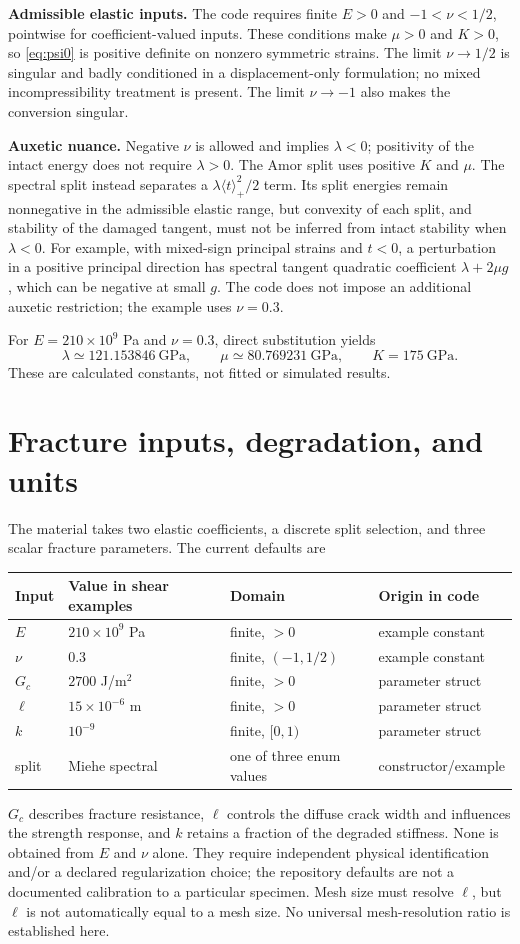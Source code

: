 \documentclass[11pt,a4paper]{article}
\newcommand{\pos}[1]{\langle #1\rangle_+}
\newcommand{\sectionpage}[1]{\clearpage\section{#1}}
\numberwithin{equation}{section}
\begin{document}
\textbf{Admissible elastic inputs.} The code requires finite $E>0$ and
$-1<\nu<1/2$, pointwise for coefficient-valued inputs. These conditions make
$\mu>0$ and $K>0$, so \eqref{eq:psi0} is positive definite on nonzero symmetric
strains. The limit $\nu\to1/2$ is singular and badly conditioned in a
displacement-only formulation; no mixed incompressibility treatment is present.
The limit $\nu\to-1$ also makes the conversion singular.

\textbf{Auxetic nuance.} Negative $\nu$ is allowed and implies $\lambda<0$;
positivity of the intact energy does not require $\lambda>0$. The Amor split
uses positive $K$ and $\mu$. The spectral split instead separates a
$\lambda\pos{t}^{2}/2$ term. Its split energies remain nonnegative in the
admissible elastic range, but convexity of each split, and stability of the
damaged tangent, must not be inferred from intact stability when $\lambda<0$.
For example, with mixed-sign principal strains and $t<0$, a perturbation in a
positive principal direction has spectral tangent quadratic coefficient
$\lambda+2\mu g$, which can be negative at small $g$. The code does not impose
an additional auxetic restriction; the example uses $\nu=0.3$.

For $E=210\times10^9$ Pa and $\nu=0.3$, direct substitution yields
\[
 \lambda\simeq121.153846\ \text{GPa},\qquad
 \mu\simeq80.769231\ \text{GPa},\qquad K=175\ \text{GPa}.
\]
These are calculated constants, not fitted or simulated results.

\sectionpage{Fracture inputs, degradation, and units}
\label{sec:inputs}
The material takes two elastic coefficients, a discrete split selection, and
three scalar fracture parameters. The current defaults are
\begin{center}
\begin{tabular}{@{}llll@{}}
\toprule Input & Value in shear examples & Domain & Origin in code\\\midrule
$E$ & $210\times10^9$ Pa & finite, $>0$ & example constant\\
$\nu$ & $0.3$ & finite, $(-1,1/2)$ & example constant\\
$G_c$ & $2700$ J/m$^2$ & finite, $>0$ & parameter struct\\
$\ell$ & $15\times10^{-6}$ m & finite, $>0$ & parameter struct\\
$k$ & $10^{-9}$ & finite, $[0,1)$ & parameter struct\\
split & Miehe spectral & one of three enum values & constructor/example\\
\bottomrule
\end{tabular}
\end{center}
$G_c$ describes fracture resistance, $\ell$ controls the diffuse crack width
and influences the strength response, and $k$ retains a fraction of the
degraded stiffness. None is obtained from $E$ and $\nu$ alone. They require
independent physical identification and/or a declared regularization choice;
the repository defaults are not a documented calibration to a particular
specimen. Mesh size must resolve $\ell$, but $\ell$ is not automatically equal
to a mesh size. No universal mesh-resolution ratio is established here.
\end{document}
